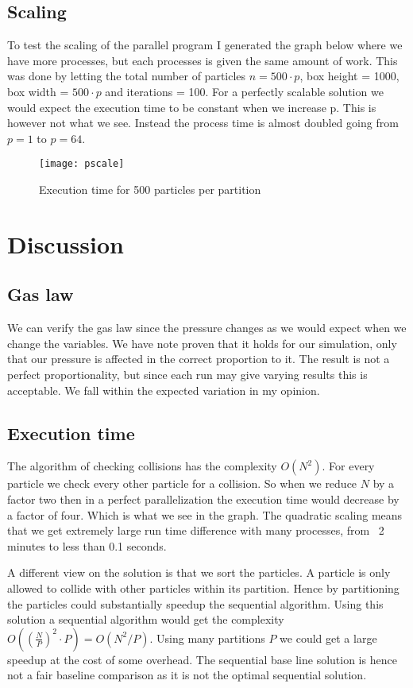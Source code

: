 \documentclass{article}
\begin{document}
\subsection{Scaling}
To test the scaling of the parallel program I generated the graph below where we have more processes, but each processes is given the same amount of work. This was done by letting the total number of particles $n = 500 \cdot p$, box height = 1000, box width = $500 \cdot p$ and iterations = 100. For a perfectly scalable solution we would expect the execution time to be constant when we increase p. This is however not what we see. Instead the process time is almost doubled going from $p=1$ to $p=64$.


\begin{figure}[h]
	\caption{Execution time for 500 particles per partition}
	\centering
	\texttt{[image: pscale]}
\end{figure}




\section{Discussion}

\subsection{Gas law}
We can verify the gas law since the pressure changes as we would expect when we change the variables. We have note proven that it holds for our simulation, only that our pressure is affected in the correct proportion to it. The result is not a perfect proportionality, but since each run may give varying results this is acceptable. We fall within the expected variation in my opinion.

\subsection{Execution time}
The algorithm of checking collisions has the complexity $O(N^2)$. For every particle we check every other particle for a collision. So when we reduce $N$ by a factor two then in a perfect parallelization the execution time would decrease by a factor of four. Which is what we see in the graph. The quadratic scaling means that we get extremely large run time difference with many processes, from ~2 minutes to less than 0.1 seconds.

A different view on the solution is that we sort the particles. A particle is only allowed to collide with other particles within its partition. Hence by partitioning the particles could substantially speedup the sequential algorithm. Using this solution a sequential algorithm would get the complexity $O((\frac{N}{P})^2 \cdot P) = O(N^2 / P)$. Using many partitions $P$ we could get a large speedup at the cost of some overhead. The sequential base line solution is hence not a fair baseline comparison as it is not the optimal sequential solution. 
\end{document}
